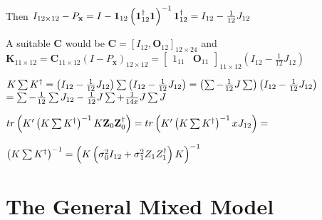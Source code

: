 \documentclass{article}
\begin{document}
\bigskip 

Then $I_{12\times 12}-P_{\mathbf{x}}=I-\boldsymbol{1}_{12}\left( \boldsymbol{%
1}_{12}^{\dagger }\boldsymbol{1}\right) ^{-1}\boldsymbol{1}_{12}^{\dagger
}=I_{12}-\frac{1}{12}J_{12}$

A suitable $\mathbf{C}$ would be $\mathbf{C}=\left[ I_{12},\mathbf{O}_{12}%
\right] _{12\times 24}$ and\newline
$\mathbf{K}_{11\times 12}=\mathbf{C}_{11\times 12}\left( I-P_{\mathbf{x}%
}\right) _{12\times 12}=\left[ 
\begin{array}{cc}
1_{11} & \mathbf{O}_{11}%
\end{array}%
\right] _{11\times 12}\left( I_{12}-\frac{1}{12}J_{12}\right) $

\bigskip 

$K\mathop{\textstyle \sum } K^{\dagger }=\left( I_{12}-\frac{1}{12}J_{12}\right) \mathop{\textstyle \sum } \left(
I_{12}-\frac{1}{12}J_{12}\right) =\left( \mathop{\textstyle \sum } -\frac{1}{12}J\mathop{\textstyle \sum } \right)
\left( I_{12}-\frac{1}{12}J_{12}\right) $\newline
$=\mathop{\textstyle \sum } -\frac{1}{12}\mathop{\textstyle \sum } J_{12}-\frac{1}{12}J\mathop{\textstyle \sum } +\frac{1}{14x}J\mathop{\textstyle \sum } J$

\bigskip 

$tr\left( K^{\prime }\left( K\tsum K^{\dagger }\right) ^{-1}K\mathbf{Z}_{0}%
\mathbf{Z}_{0}^{\dagger }\right) =tr\left( K^{\prime }\left( K\tsum
K^{\dagger }\right) ^{-1}xJ_{12}\right) =$

$\left( K\tsum K^{\dagger }\right) ^{-1}=\left( K\left( \sigma
_{0}^{2}I_{12}+\sigma _{1}^{2}Z_{1}Z_{1}^{\dagger }\right) K\right) ^{-1}$

\bigskip 

\bigskip 

\section{The General Mixed Model}

\bigskip 
\end{document}
